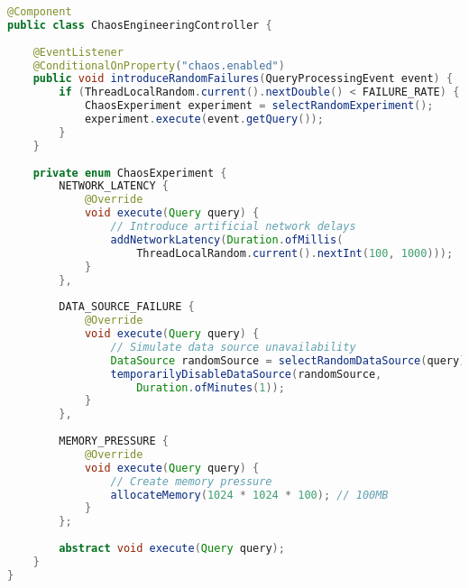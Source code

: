 \documentclass[11pt,a4paper]{article}
\begin{document}
\begin{lstlisting}[language=Java, caption=Chaos Engineering Framework]
@Component
public class ChaosEngineeringController {
    
    @EventListener
    @ConditionalOnProperty("chaos.enabled")
    public void introduceRandomFailures(QueryProcessingEvent event) {
        if (ThreadLocalRandom.current().nextDouble() < FAILURE_RATE) {
            ChaosExperiment experiment = selectRandomExperiment();
            experiment.execute(event.getQuery());
        }
    }
    
    private enum ChaosExperiment {
        NETWORK_LATENCY {
            @Override
            void execute(Query query) {
                // Introduce artificial network delays
                addNetworkLatency(Duration.ofMillis(
                    ThreadLocalRandom.current().nextInt(100, 1000)));
            }
        },
        
        DATA_SOURCE_FAILURE {
            @Override
            void execute(Query query) {
                // Simulate data source unavailability
                DataSource randomSource = selectRandomDataSource(query);
                temporarilyDisableDataSource(randomSource, 
                    Duration.ofMinutes(1));
            }
        },
        
        MEMORY_PRESSURE {
            @Override
            void execute(Query query) {
                // Create memory pressure
                allocateMemory(1024 * 1024 * 100); // 100MB
            }
        };
        
        abstract void execute(Query query);
    }
}
\end{lstlisting}



\end{document}
